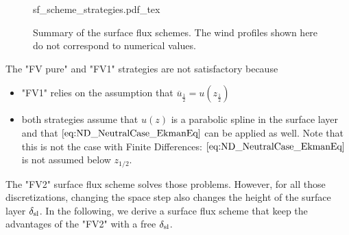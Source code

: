\begin{figure}
	\centering
	{sf_scheme_strategies.pdf_tex}
	\caption{Summary of the surface flux schemes. The
	wind profiles shown here do not correspond to
	numerical values.}
	\label{fig:ND_NeutralCase_summary_sfscheme}
\end{figure}

The "FV pure" and "FV1" strategies are not satisfactory because
\begin{itemize}
	\item "FV1" relies on the assumption that $\overline{u}_{\frac{1}{2}} = u(z_{\frac{1}{2}})$
	\item both strategies assume that $u(z)$ is a parabolic spline in the surface layer and that $\eqref{eq:ND_NeutralCase_EkmanEq}$
		can be applied as well. Note that this is not
		the case with Finite Differences:
		$\eqref{eq:ND_NeutralCase_EkmanEq}$ is not assumed
		below $z_{1/2}$.
\end{itemize}
The "FV2" surface flux scheme solves those problems.
However, for all those discretizations, changing the space step
also changes the height of the surface layer $\delta_{\rm sl}$.
In the following, we derive a surface flux scheme that keep
the advantages of the "FV2" with a free $\delta_{\rm sl}$.

